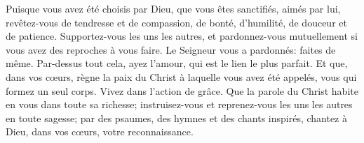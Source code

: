 Puisque vous avez été choisis par Dieu,
	que vous êtes sanctifiés, aimés par lui,
	revêtez-vous de tendresse et de compassion,
	de bonté, d’humilité, de douceur et de patience.
Supportez-vous les uns les autres,
	et pardonnez-vous mutuellement si vous avez des reproches à vous faire.
	Le Seigneur vous a pardonnés: faites de même.
Par-dessus tout cela, ayez l’amour, qui est le lien le plus parfait.
Et que, dans vos cœurs, règne la paix du Christ à laquelle vous avez été appelés,
	vous qui formez un seul corps.
	Vivez dans l’action de grâce.
Que la parole du Christ habite en vous dans toute sa richesse;
	instruisez-vous et reprenez-vous les uns les autres en toute sagesse;
	par des psaumes, des hymnes et des chants inspirés,
	chantez à Dieu, dans vos cœurs, votre reconnaissance.
